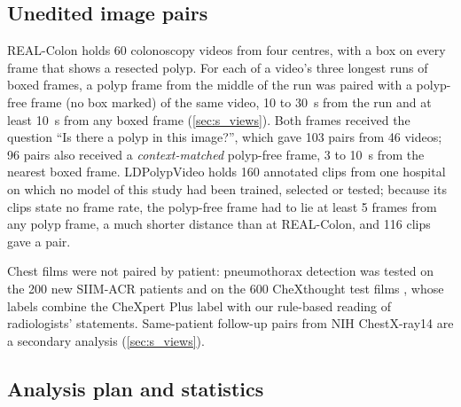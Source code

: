 \subsection{Unedited image pairs}
\label{subsec:pairs}

REAL-Colon \citep{biffi2024realcolon} holds 60 colonoscopy videos from four centres, with a box on every frame that shows a resected polyp. For each of a video's three longest runs of boxed frames, a polyp frame from the middle of the run was paired with a polyp-free frame (no box marked) of the same video, 10 to 30~s from the run and at least 10~s from any boxed frame (\ref{sec:s_views}). Both frames received the question ``Is there a polyp in this image?'', which gave 103 pairs from 46 videos; 96 pairs also received a \emph{context-matched} polyp-free frame, 3 to 10~s from the nearest boxed frame. LDPolypVideo \citep{ma2021ldpolyp} holds 160 annotated clips from one hospital on which no model of this study had been trained, selected or tested; because its clips state no frame rate, the polyp-free frame had to lie at least 5 frames from any polyp frame, a much shorter distance than at REAL-Colon, and 116 clips gave a pair.

Chest films were not paired by patient: pneumothorax detection was tested on the 200 new SIIM-ACR patients \citep{siim2019pneumothorax} and on the 600 CheXthought test films \citep{sharma2026chexthought}, whose labels combine the CheXpert Plus label \citep{chambon2024chexpertplus} with our rule-based reading of radiologists' statements. Same-patient follow-up pairs from NIH ChestX-ray14 \citep{wang2017chestx} are a secondary analysis (\ref{sec:s_views}).

\subsection{Analysis plan and statistics}
\label{subsec:stats}

